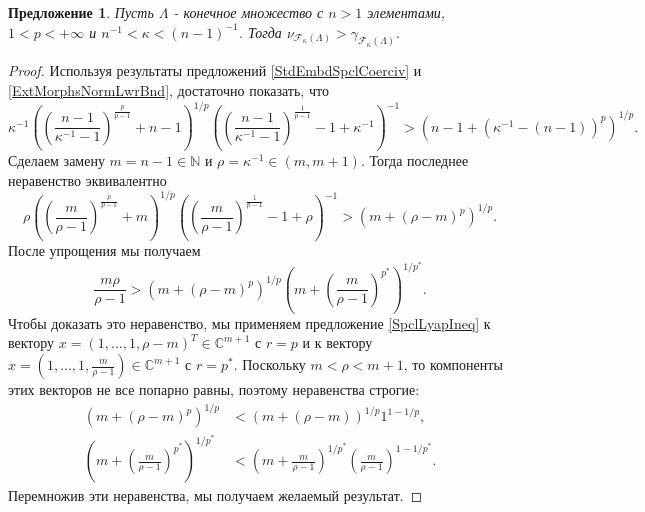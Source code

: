 \documentclass[12pt]{article}
\newtheorem{proposition}[theorem]{Предложение}
\begin{document}
\begin{proposition}\label{CompStdEmbdCoercvAndExtMorphsNormInf}
    Пусть $\Lambda$ - конечное множество с $n>1$ элементами, $1<p<+\infty$ 
    и $n^{-1}<\kappa<(n-1)^{-1}$. Тогда
    $
    \nu_{\mathcal{F}_{\kappa}(\Lambda)}
    >
    \gamma_{\mathcal{F}_{\kappa}(\Lambda)}.
    $
\end{proposition}
\begin{proof}
    Используя результаты предложений \ref{StdEmbdSpclCoerciv} 
    и \ref{ExtMorphsNormLwrBnd}, достаточно показать, что
    \[
        \kappa^{-1}
        \left(
            \left(\frac{n-1}{\kappa^{-1}-1}
            \right)^{\frac{p}{p-1}}
            +n-1
        \right)^{1/p}
        \left(
            \left(\frac{n-1}{\kappa^{-1}-1}
            \right)^{\frac{1}{p-1}}
            -1+\kappa^{-1}
        \right)^{-1}
        >
        (n-1+(\kappa^{-1}-(n-1))^p)^{1/p}.
    \]
    Сделаем замену $m=n-1\in\mathbb{N}$ и $\rho=\kappa^{-1}\in(m, m+1)$. 
    Тогда последнее неравенство эквивалентно
    \[
        \rho
        \left(
        \left(\frac{m}{\rho-1}
            \right)^{\frac{p}{p-1}}
            +m
        \right)^{1/p}
        \left(
            \left(\frac{m}{\rho-1}
            \right)^{\frac{1}{p-1}}
            -1+\rho
        \right)^{-1}
        >
        (m+(\rho-m)^p)^{1/p}.
    \] 
    После упрощения мы получаем 
    \[
        \frac{m\rho}{\rho-1}
        >
        (m+(\rho-m)^p)^{1/p}
        \left(
            m+\left(\frac{m}{\rho-1}\right)^{p^*}
        \right)^{1/p^*}.
    \]
    Чтобы доказать это неравенство, мы применяем предложение \ref{SpclLyapIneq} к 
    вектору $x=(1,\ldots,1,\rho-m)^T\in\mathbb{C}^{m+1}$ с $r=p$ и к вектору 
    $x=(1,\ldots,1,\frac{m}{\rho-1})\in\mathbb{C}^{m+1}$ с $r=p^*$. 
    Поскольку $m<\rho<m+1$, то компоненты этих векторов не все попарно равны,
    поэтому неравенства строгие:
    \[
    \begin{aligned}
        (m+(\rho-m)^p)^{1/p}
        &<
        (m+(\rho-m))^{1/p} 1^{1-1/p},\\
        \left(m+\left(\frac{m}{\rho-1}\right)^{p^*}\right)^{1/p^*}
        &<
        \left(m+\frac{m}{\rho-1}\right)^{1/p^*}
        \left(\frac{m}{\rho-1}\right)^{1-1/p^*}.
    \end{aligned}
    \]
    Перемножив эти неравенства, мы получаем желаемый результат.
\end{proof}
\end{document}
